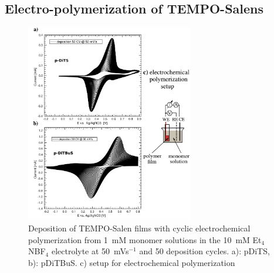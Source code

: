 \subsection{Electro-polymerization of TEMPO-Salens}
\begin{figure}%
	\includegraphics[width=0.65\textwidth]{./electrochemistry/figures/DITBUS_DEPO.pdf}
	\caption{Deposition of TEMPO-Salen films with cyclic electrochemical polymerization from 1~mM monomer solutions in the 10~mM Et$_4$NBF$_4$ electrolyte at 50~mVs$^{-1}$ and 50 deposition cycles. a): pDiTS, b): pDiTBuS. c) setup for electrochemical polymerization}
	\label{fig:DITBUS_DEPO}
\end{figure}

